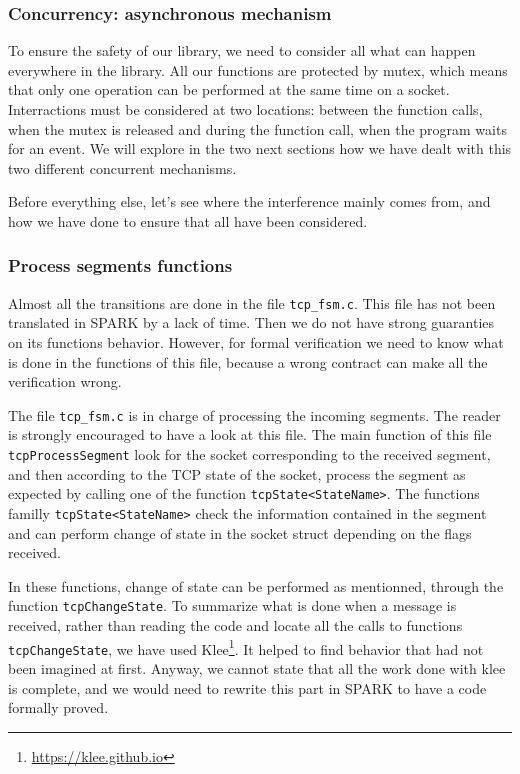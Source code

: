 \documentclass[a4paper, 10pt]{article}
\begin{document}
    \subsubsection{Concurrency: asynchronous mechanism}

    To ensure the safety of our library, we need to consider all what can happen everywhere in
    the library. All our functions are protected by mutex, which means that only one operation
    can be performed at the same time on a socket. Interractions must be considered at two
    locations: between the function calls, when the mutex is released and during the function
    call, when the program waits for an event. We will explore in the two next sections how we
    have dealt with this two different concurrent mechanisms.

    Before everything else, let's see where the interference mainly comes from, and how we have
    done to ensure that all have been considered.

    \subsubsection{Process segments functions}

    Almost all the transitions are done in the file \texttt{tcp\_fsm.c}. This file has not been
    translated in SPARK by a lack of time. Then we do not have strong guaranties on its functions
    behavior. However, for formal verification we need to know what is done in the functions of
    this file, because a wrong contract can make all the verification wrong.

    The file \texttt{tcp\_fsm.c} is in charge of processing the incoming segments. The reader is
    strongly encouraged to have a look at this file. The main function of this file
    \texttt{tcpProcessSegment} look for the socket corresponding to the received segment, and then
    according to the TCP state of the socket, process the segment as expected by calling one of
    the function \texttt{tcpState<StateName>}. The functions familly \texttt{tcpState<StateName>}
    check the information contained in the segment and can perform change of state in the socket
    struct depending on the flags received.

    In these functions, change of state can be performed as mentionned, through the function
    \texttt{tcpChangeState}. To summarize what is done when a message is received, rather than
    reading the code and locate all the calls to functions \texttt{tcpChangeState}, we have used
    Klee\footnote{\url{https://klee.github.io}}. It helped to find behavior that had not been
    imagined at first. Anyway, we cannot state that all the work done with klee is complete, and
    we would need to rewrite this part in SPARK to have a code formally proved.
\end{document}

